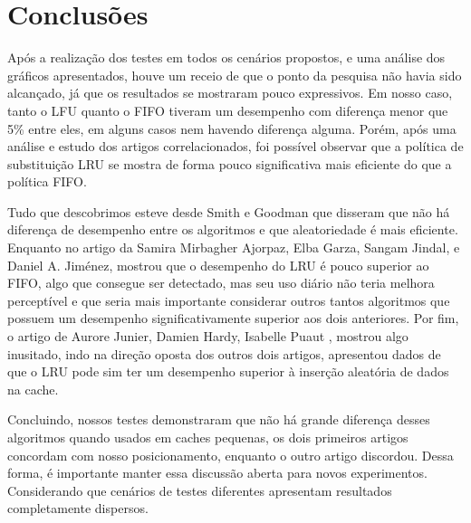 \section{Conclusões}


    Após a realização dos testes em todos os cenários propostos, e uma análise dos gráficos apresentados, houve um 
    receio de que o ponto da pesquisa não havia sido alcançado, já que os resultados se mostraram pouco expressivos. 
    Em nosso caso, tanto o LFU quanto o FIFO tiveram um desempenho com diferença menor que 5\% entre eles, em alguns 
    casos nem havendo diferença alguma. Porém, após uma análise e estudo dos artigos correlacionados, foi possível observar que 
    a política de substituição LRU se mostra de forma pouco significativa mais eficiente do que a política FIFO. 

    Tudo que descobrimos esteve desde Smith e Goodman \cite{b1} que disseram que não há diferença de desempenho entre os algoritmos 
    e que aleatoriedade é mais eficiente. Enquanto no artigo da Samira Mirbagher Ajorpaz, Elba Garza, Sangam Jindal, e Daniel A. Jiménez\cite{b3}, 
    mostrou que o desempenho do LRU é pouco superior ao FIFO, algo que consegue ser detectado, mas seu uso diário não teria melhora perceptível e 
    que seria mais importante considerar outros tantos algoritmos que possuem um desempenho significativamente superior aos dois anteriores. Por fim, 
    o artigo de Aurore Junier, Damien Hardy, Isabelle Puaut \cite{b2}, mostrou algo inusitado, indo na direção oposta dos outros dois artigos, 
    apresentou dados de que o LRU pode sim ter um desempenho superior à inserção aleatória de dados na cache.

    Concluindo, nossos testes demonstraram que não há grande diferença desses algoritmos quando usados em caches pequenas, os dois primeiros artigos
    concordam com nosso posicionamento, enquanto o outro artigo discordou. Dessa forma, é importante manter essa discussão aberta para novos experimentos.
    Considerando que cenários de testes diferentes apresentam resultados completamente dispersos.
